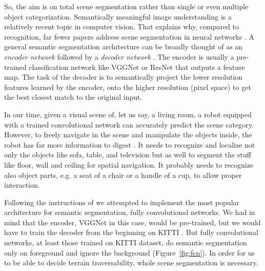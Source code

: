 \documentclass[12pt,a4paper]{report}
\newcommand{\term}{\textit}
\newcommand{\acronym}{\MakeUppercase}
\begin{document}
	So, the aim is on total scene segmentation rather than single or even multiple object 
	categorization. Semantically meaningful image understanding is a relatively recent topic 
	in computer vision. That explains why, compared to recognition, far fewer papers address 
	scene segmentation in neural networks \cite{Wang}. A general semantic segmentation 
	architecture can be broadly thought of as an \term{encoder network} followed by a 
	\term{decoder network} \citep{Le}. The encoder is usually a pre-trained classification 
	network like VGGNet or ResNet that outputs a feature map. The task of the decoder is 
	to semantically project the lower resolution features learned by the encoder, onto the 
	higher resolution (pixel space) to get the best closest match to the original input.
	\par
	In our time, given a visual scene of, let us say, a living room, a robot equipped with 
	a trained convolutional network can accurately predict the scene category. However, to 
	freely navigate in the scene and manipulate the objects inside, the robot has far more 
	information to digest \citep{Zhou_sem}. It needs to recognize and localize not only the 
	objects like sofa, table, and television but as well to segment the stuff like floor, 
	wall and ceiling for spatial navigation. It probably needs to recognize also object parts, 
	e.g. a seat of a chair or a handle of a cup, to allow proper interaction.
	\par
	Following the instructions of \citet{Le} we attempted to implement the most popular 
	architecture for semantic segmentation, fully convolutional networks. We had in mind 
	that the encoder, VGGNet in this case, would be pre-trained, but we would have to 
	train the decoder from the beginning on \acronym{kitti} \citep{kitti}. But fully 
	convolutional networks, at least those trained on \acronym{kitti} dataset, do semantic 
	segmentation only on foreground and ignore the background (Figure~\ref{fig:fcn}). In 
	order for us to be able to decide terrain traversability, whole scene segmentation is 
	necessary.
	\\
	
\end{document}
